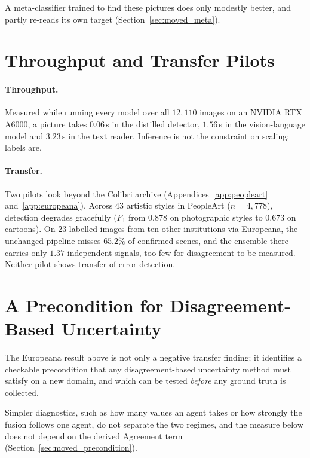 \documentclass[12pt,a4paper]{report}
\begin{document}
A meta-classifier trained to find these pictures does only modestly better, and partly re-reads its own target (Section~\ref{sec:moved_meta}).

\section{Throughput and Transfer Pilots}
\label{sec:throughput_transfer}
\paragraph{Throughput.} Measured while running every model over all $12{,}110$ images on an NVIDIA RTX A6000, a picture takes $0.06$\,s in the distilled detector, $1.56$\,s in the vision-language model and $3.23$\,s in the text reader. Inference is not the constraint on scaling; labels are.

\paragraph{Transfer.} Two pilots look beyond the Colibri archive (Appendices~\ref{app:peopleart} and~\ref{app:europeana}). Across $43$ artistic styles in PeopleArt ($n=4{,}778$), detection degrades gracefully ($F_1$ from $0.878$ on photographic styles to $0.673$ on cartoons). On $23$ labelled images from ten other institutions via Europeana, the unchanged pipeline misses $65.2\%$ of confirmed scenes, and the ensemble there carries only $1.37$ independent signals, too few for disagreement to be measured. Neither pilot shows transfer of error detection.

\section{A Precondition for Disagreement-Based Uncertainty}
\label{sec:heterogeneity_precondition}
The Europeana result above is not only a negative transfer finding; it identifies a checkable precondition that any disagreement-based uncertainty method must satisfy on a new domain, and which can be tested \emph{before} any ground truth is collected.

Simpler diagnostics, such as how many values an agent takes or how strongly the fusion follows one agent, do not separate the two regimes, and the measure below does not depend on the derived Agreement term (Section~\ref{sec:moved_precondition}).
\end{document}
